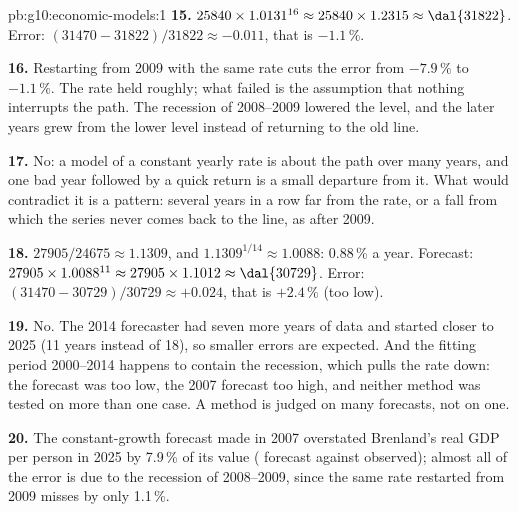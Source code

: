 \begin{solution}{pb:g10:economic-models:1}
\textbf{15.} $25840 \times 1.0131^{16} \approx 25840 \times 1.2315 \approx \text{\dal{31822}}$. Error:
$(31470 - 31822)/31822 \approx -0.011$, that is $-1.1\,\%$.

\textbf{16.} Restarting from 2009 with the same rate cuts the error from $-7.9\,\%$ to $-1.1\,\%$.
The rate held roughly; what failed is the assumption that nothing interrupts the path. The recession
of 2008--2009 lowered the level, and the later years grew from the lower level instead of returning
to the old line.

\textbf{17.} No: a model of a constant yearly rate is about the path over many years, and one bad
year followed by a quick return is a small departure from it. What would contradict it is a pattern:
several years in a row far from the rate, or a fall from which the series never comes back to the
line, as after 2009.

\textbf{18.} $27905/24675 \approx 1.1309$, and $1.1309^{1/14} \approx 1.0088$: 0.88\,\% a year.
Forecast: $27905 \times 1.0088^{11} \approx 27905 \times 1.1012 \approx \text{\dal{30729}}$. Error:
$(31470 - 30729)/30729 \approx +0.024$, that is $+2.4\,\%$ (too low).

\textbf{19.} No. The 2014 forecaster had seven more years of data and started closer to 2025 (11 years
instead of 18), so smaller errors are expected. And the fitting period 2000--2014 happens to contain
the recession, which pulls the rate down: the forecast was too low, the 2007 forecast too high, and
neither method was tested on more than one case. A method is judged on many forecasts, not on one.

\textbf{20.} The constant-growth forecast made in 2007 overstated Brenland's real GDP per person in
2025 by 7.9\,\% of its value ( forecast against  observed); almost all of the
error is due to the recession of 2008--2009, since the same rate restarted from 2009 misses by only
1.1\,\%.
\end{solution}
